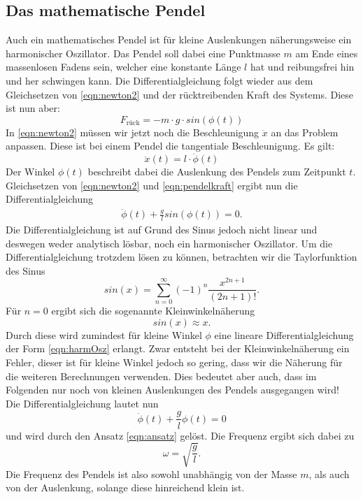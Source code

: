 \subsection{Das mathematische Pendel}
Auch ein mathematisches Pendel ist für kleine Auslenkungen näherungsweise ein harmonischer Oszillator. Das Pendel soll dabei eine
Punktmasse $m$ am Ende eines massenlosen Fadens sein, welcher eine konstante Länge $l$ hat und reibungsfrei hin und her schwingen kann.
Die Differentialgleichung folgt wieder aus dem Gleichsetzen von \eqref{eqn:newton2} und der rücktreibenden Kraft des Systems.
Diese ist nun aber:
\begin{equation}
    F_\text{rück}=-m\cdot g\cdot sin(\phi(t)) \label{eqn:pendelkraft}
\end{equation}
In \eqref{eqn:newton2} müssen wir jetzt noch die Beschleunigung $\ddot x$ an das Problem anpassen. Diese ist bei einem Pendel die tangentiale
Beschleunigung. Es gilt:
\begin{equation}
    \ddot x(t)=l\cdot \ddot{\phi}(t)
\end{equation}
Der Winkel $\phi(t)$ beschreibt dabei die Auslenkung des Pendels zum Zeitpunkt $t$. Gleichsetzen von \eqref{eqn:newton2} und
\eqref{eqn:pendelkraft} ergibt nun die Differentialgleichung
\begin{eqnarray}
    \ddot{\phi}(t)+\frac{g}{l}sin(\phi(t))=0.
\end{eqnarray}
Die Differentialgleichung ist auf Grund des Sinus jedoch nicht linear und deswegen weder analytisch lösbar, noch ein harmonischer Oszillator.
Um die Differentialgleichung trotzdem lösen zu können, betrachten wir die Taylorfunktion des Sinus
\begin{equation}
    sin(x)=\sum_{n=0}^\infty (-1)^n\frac{x^{2n+1}}{(2n+1)!}.
\end{equation}
Für $n=0$ ergibt sich die sogenannte Kleinwinkelnäherung
\begin{equation}
    sin(x)\approx x. \label{eqn:kleinwinkel}
\end{equation}
Durch diese wird zumindest für kleine Winkel $\phi$ eine lineare Differentialgleichung der Form \eqref{eqn:harmOsz} erlangt. Zwar entsteht bei der
Kleinwinkelnäherung ein Fehler, dieser ist für kleine Winkel jedoch so gering, dass wir die Näherung für die weiteren Berechnungen verwenden.
Dies bedeutet aber auch, dass im Folgenden nur noch von kleinen Auslenkungen des Pendels ausgegangen wird!
\\
Die Differentialgleichung lautet nun
\begin{equation}
    \ddot{\phi}(t)+\frac{g}{l}\phi(t)=0
\end{equation}
und wird durch den Ansatz \eqref{eqn:ansatz} gelöst. Die Frequenz ergibt sich dabei zu
\begin{equation}
    \omega=\sqrt{\frac{g}{l}}.
\end{equation}
Die Frequenz des Pendels ist also sowohl unabhängig von der Masse $m$, als auch von der Auslenkung, solange diese hinreichend klein ist.

